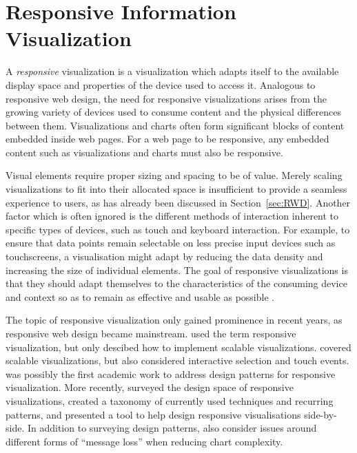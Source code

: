 
\chapter{Responsive Information Visualization}

A \emph{responsive} visualization is a visualization which adapts
itself to the available display space and properties of the device
used to access it. Analogous to responsive web design, the need for
responsive visualizations arises from the growing variety of devices
used to consume content and the physical differences between them.
Visualizations and charts often form significant blocks of content
embedded inside web pages. For a web page to be responsive, any
embedded content such as visualizations and charts must also be
responsive.

Visual elements require proper sizing and spacing to be of
value. Merely scaling visualizations to fit into their allocated space
is insufficient to provide a seamless experience to users, as has
already been discussed in Section~\ref{sec:RWD}. Another factor which
is often ignored is the different methods of interaction inherent to
specific types of devices, such as touch and keyboard interaction. For
example, to ensure that data points remain selectable on less precise
input devices such as touchscreens, a visualisation might adapt by
reducing the data density and increasing the size of individual
elements. The goal of responsive visualizations is that they should
adapt themselves to the characteristics of the consuming device and
context so as to remain as effective and usable as possible
\parencite{DesignPatternsTradeOffsRespVis}.


The topic of responsive visualization only gained prominence in recent
years, as responsive web design became mainstream.
\textcite{BuildingRespDataVisForTheWeb} used the term responsive
visualization, but only descibed how to implement scalable
visualizations. \textcite{LearningRespDataVis} covered scalable
visualizations, but also considered interactive selection and touch
events. \textcite{RespVis} was possibly the first academic work to
address design patterns for responsive visualization.
%
More recently, \parencite{TechniquesForFlexibleRespVisDesign} surveyed
the design space of responsive visualizations, created a taxonomy of
currently used techniques and recurring patterns, and presented a tool
to help design responsive visualisations side-by-side. In addition to
surveying design patterns, \textcite{DesignPatternsTradeOffsRespVis}
also consider issues around different forms of \enquote{message loss}
when reducing chart complexity.





